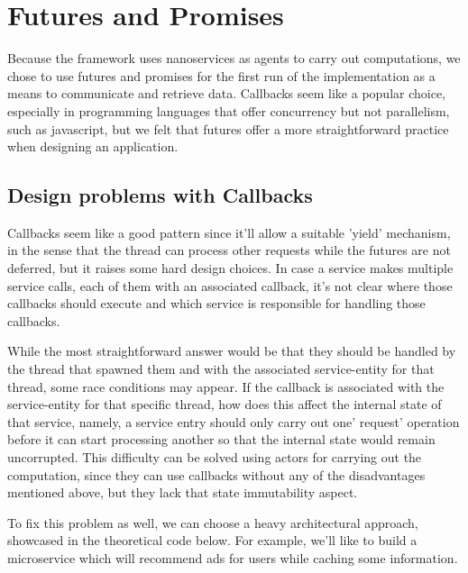 \section{Futures and Promises}
Because the framework uses nanoservices as agents to carry out computations, we chose to use futures and promises for the first run of the implementation as a means to communicate and retrieve data. Callbacks seem like a popular choice, especially in programming languages that offer concurrency but not parallelism, such as javascript, but we felt that futures offer a more straightforward practice when designing an application.

\subsection*{Design problems with Callbacks}
Callbacks seem like a good pattern since it'll allow a suitable 'yield' mechanism, in the sense that the thread can process other requests while the futures are not deferred, but it raises some hard design choices. In case a service makes multiple service calls, each of them with an associated callback, it's not clear where those callbacks should execute and which service is responsible for handling those callbacks. 

While the most straightforward answer would be that they should be handled by the thread that spawned them and with the associated service-entity for that thread, some race conditions may appear. If the callback is associated with the service-entity for that specific thread, how does this affect the internal state of that service, namely, a service entry should only carry out one' request' operation before it can start processing another so that the internal state would remain uncorrupted. This difficulty can be solved using actors for carrying out the computation, since they can use callbacks without any of the disadvantages mentioned above, but they lack that state immutability aspect. 

To fix this problem as well, we can choose a heavy architectural approach, showcased in the theoretical code below. For example, we'll like to build a microservice which will recommend ads for users while caching some information.

